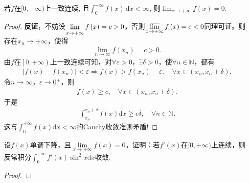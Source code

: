 \documentclass[../../main.tex]{subfiles}
\begin{document}
\begin{proposition}
若$f$在$[0, +\infty)$上一致连续, 且$\int_0^{+\infty} f(x) \, \mathrm{d}x < \infty$, 则$\lim_{x \to +\infty} f(x) = 0$.
\end{proposition}
\begin{proof}
\textbf{反证}，不妨设$\varliminf\limits_{x\rightarrow +\infty}f\left( x \right) =c>0$，否则$\varlimsup\limits_{x\rightarrow +\infty}f\left( x \right) =c<0$同理可证。则存在$x_n\rightarrow +\infty$，使得
\begin{align*}
\lim\limits_{n\rightarrow \infty}f\left( x_n \right) =c>0.
\end{align*}
由$f$在$\left[ 0,+\infty \right)$上一致连续可知，对$\forall \varepsilon >0$，$\exists \delta >0$，使$\forall n\in \mathbb{N}$，都有
\begin{align*}
\left| f\left( x \right) -f\left( x_n \right) \right|<\varepsilon \Longrightarrow f\left( x \right) >f\left( x_n \right) -\varepsilon ,\quad \forall x\in \left( x_n,x_n+\delta \right) .
\end{align*}
令$n\rightarrow \infty$，$\varepsilon \rightarrow 0^+$，则
\begin{align*}
f\left( x \right) \geqslant c,\quad \forall x\in \left( x_n,x_n+\delta \right) .
\end{align*}
于是
\begin{align*}
\int_{x_n}^{x_n+\delta}{f\left( x \right) \mathrm{d}x}\geqslant c\delta ,\quad \forall n\in \mathbb{N} .
\end{align*}
这与$\int_0^{+\infty}{f\left( x \right) \mathrm{d}x}<\infty$的Cauchy收敛准则矛盾!

\end{proof}

\begin{example}
设\(f(x)\)单调下降，且\(\lim\limits_{x \to +\infty} f(x)=0\)，证明：若\(f'(x)\)在\([0, +\infty)\)上连续，则反常积分\(\int_{0}^{+\infty} f'(x)\sin^{2} x\mathrm{d}x\)收敛.
\end{example}
\begin{proof}


\end{proof}
\end{document}

